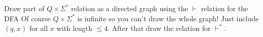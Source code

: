   Draw part of $Q \times \Sigma^*$ relation as a directed graph
  using the $\vdash$ relation for the DFA
Of course $Q \times \Sigma^*$ is infinite so you can't
draw the whole graph!
Just include $(q, x)$ for all $x$ with length $\leq 4$.
After that draw the relation for $\vdash^*$.
